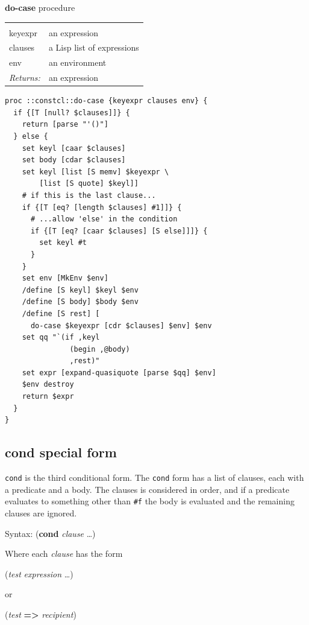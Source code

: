 \documentclass[twoside]{report}
\begin{document}
\textbf{do-case} procedure

\noindent\begin{tabular}{ |p{1.9cm} p{8cm}| }
\hline
\rowcolor[HTML]{CCCCCC} \multicolumn{2}{|l|}{\bf do-case (internal)} \\
keyexpr & an expression \\
clauses & a Lisp list of expressions \\
env & an environment \\
\textit{Returns:} & an expression \\
\hline
\end{tabular}

\begin{lstlisting}
proc ::constcl::do-case {keyexpr clauses env} {
  if {[T [null? $clauses]]} {
    return [parse "'()"]
  } else {
    set keyl [caar $clauses]
    set body [cdar $clauses]
    set keyl [list [S memv] $keyexpr \
        [list [S quote] $keyl]]
    # if this is the last clause...
    if {[T [eq? [length $clauses] #1]]} {
      # ...allow 'else' in the condition
      if {[T [eq? [caar $clauses] [S else]]]} {
        set keyl #t
      }
    }
    set env [MkEnv $env]
    /define [S keyl] $keyl $env
    /define [S body] $body $env
    /define [S rest] [
      do-case $keyexpr [cdr $clauses] $env] $env
    set qq "`(if ,keyl
               (begin ,@body)
               ,rest)"
    set expr [expand-quasiquote [parse $qq] $env]
    $env destroy
    return $expr
  }
}
\end{lstlisting}

\subsection{cond special form}
\label{cond-special-form}

\texttt{cond} is the third conditional form. The \texttt{cond} form has a list of clauses, each with a predicate and a body. The clauses is considered in order, and if a predicate evaluates to something other than \texttt{\#f} the body is evaluated and the remaining clauses are ignored.

Syntax: (\textbf{cond} \emph{clause} \ldots )

Where each \emph{clause} has the form

(\emph{test} \emph{expression} \ldots )

or

(\emph{test} \textbf{=>} \emph{recipient})
\end{document}
